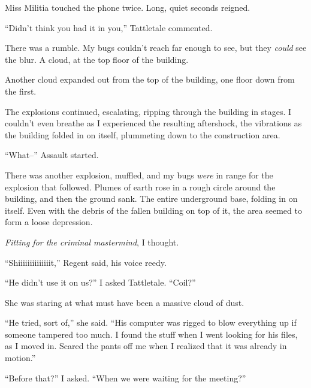 Miss Militia touched the phone twice.  Long, quiet seconds reigned.



``Didn't think you had it in you,'' Tattletale commented.



There was a rumble.  My bugs couldn't reach far enough to see, but they \emph{could} see the blur.  A cloud, at the top floor of the building.



Another cloud expanded out from the top of the building, one floor down from the first.



The explosions continued, escalating, ripping through the building in stages.  I couldn't even breathe as I experienced the resulting aftershock, the vibrations as the building folded in on itself, plummeting down to the construction area.



``What--'' Assault started.



There was another explosion, muffled, and my bugs \emph{were} in range for the explosion that followed.  Plumes of earth rose in a rough circle around the building, and then the ground sank.  The entire underground base, folding in on itself.  Even with the debris of the fallen building on top of it, the area seemed to form a loose depression.



\emph{Fitting for the criminal mastermind}, I thought.



``Shiiiiiiiiiiiiiit,'' Regent said, his voice reedy.



``He didn't use it on us?'' I asked Tattletale.  ``Coil?''



She was staring at what must have been a massive cloud of dust.



``He tried, sort of,'' she said.  ``His computer was rigged to blow everything up if someone tampered too much.  I found the stuff when I went looking for his files, as I moved in.  Scared the pants off me when I realized that it was already in motion.''



``Before that?''  I asked.  ``When we were waiting for the meeting?''



